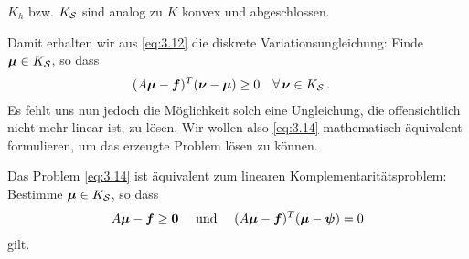 \begin{bem*}
$K_h$ bzw. $K_{\mathcal S}$ sind analog zu $K$ konvex und abgeschlossen.
\end{bem*}


Damit erhalten wir aus \eqref{eq:3.12} die diskrete Variationsungleichung: Finde $\boldsymbol\mu \in K_{\mathcal S}$, so dass
\begin{align}\label{eq:3.14}
	(A\boldsymbol \mu-\boldsymbol f)^T (\boldsymbol \nu- \boldsymbol\mu) &  \ge 0 \quad \forall \, \boldsymbol \nu \in K_{\mathcal S} \, .
\end{align}
Es fehlt uns nun jedoch die Möglichkeit solch eine Ungleichung, die offensichtlich nicht mehr linear ist, zu lösen. Wir wollen also \eqref{eq:3.14} mathematisch äquivalent formulieren, um das erzeugte Problem lösen zu können.


 \begin{satz}\label{satz:3.11}
Das Problem \eqref{eq:3.14} ist äquivalent zum linearen Komplementaritätsproblem: Bestimme $\boldsymbol\mu \in K_{\mathcal S}$, so dass
\begin{align}\label{eq:3.15}
	A\boldsymbol\mu - \boldsymbol f \ge \boldsymbol 0\quad\text{ und }\quad (A\boldsymbol\mu-\boldsymbol f)^T(\boldsymbol \mu - \boldsymbol\psi) = 0
\end{align}
gilt.
\end{satz}

